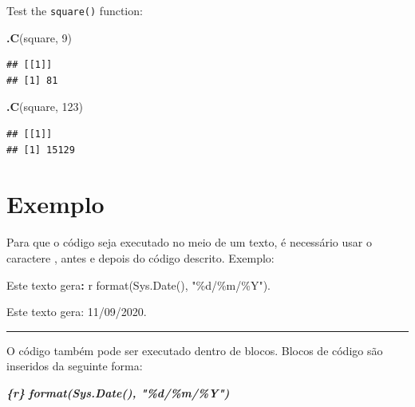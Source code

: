 \documentclass[
]{book}
\newenvironment{Shaded}{\begin{snugshade}}{\end{snugshade}}
\newcommand{\DataTypeTok}[1]{\textcolor[rgb]{0.13,0.29,0.53}{#1}}
\newcommand{\DecValTok}[1]{\textcolor[rgb]{0.00,0.00,0.81}{#1}}
\newcommand{\InformationTok}[1]{\textcolor[rgb]{0.56,0.35,0.01}{\textbf{\textit{#1}}}}
\newcommand{\KeywordTok}[1]{\textcolor[rgb]{0.13,0.29,0.53}{\textbf{#1}}}
\newcommand{\NormalTok}[1]{#1}
\newcommand{\OperatorTok}[1]{\textcolor[rgb]{0.81,0.36,0.00}{\textbf{#1}}}
\newcommand{\StringTok}[1]{\textcolor[rgb]{0.31,0.60,0.02}{#1}}
\begin{document}
Test the \texttt{square()} function:

\begin{Shaded}
\begin{Highlighting}[]
\KeywordTok{.C}\NormalTok{(}\StringTok{\textquotesingle{}square\textquotesingle{}}\NormalTok{, }\DecValTok{9}\NormalTok{)}
\end{Highlighting}
\end{Shaded}

\begin{verbatim}
## [[1]]
## [1] 81
\end{verbatim}

\begin{Shaded}
\begin{Highlighting}[]
\KeywordTok{.C}\NormalTok{(}\StringTok{\textquotesingle{}square\textquotesingle{}}\NormalTok{, }\DecValTok{123}\NormalTok{)}
\end{Highlighting}
\end{Shaded}

\begin{verbatim}
## [[1]]
## [1] 15129
\end{verbatim}

\hypertarget{exemplo}{%
\section{Exemplo}\label{exemplo}}

Para que o código seja executado no meio de um texto, é necessário usar o caractere \texttt{\textasciigrave{}}, antes e depois do código descrito. Exemplo:

\begin{Shaded}
\begin{Highlighting}[]
\NormalTok{Este texto gera}\OperatorTok{:}\StringTok{ \textasciigrave{}}\DataTypeTok{r format(Sys.Date(), "\%d/\%m/\%Y")}\StringTok{\textasciigrave{}}\NormalTok{.}
\end{Highlighting}
\end{Shaded}

Este texto gera: 11/09/2020.

\begin{center}\rule{0.5\linewidth}{0.5pt}\end{center}

O código também pode ser executado dentro de blocos. Blocos de código são inseridos da seguinte forma:

\begin{Shaded}
\begin{Highlighting}[]
\InformationTok{\textasciigrave{}\textasciigrave{}\textasciigrave{}\{r\}}
\InformationTok{format(Sys.Date(), "\%d/\%m/\%Y")}
\InformationTok{\textasciigrave{}\textasciigrave{}\textasciigrave{}}
\end{Highlighting}
\end{Shaded}
\end{document}
